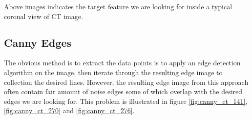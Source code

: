 Above images indicates the target feature we are looking for inside a typical coronal view of CT image.

\subsection{Canny Edges}

The obvious method is to extract the data points is to apply an edge detection algorithm on the image, then
iterate through the resulting edge image to collection the desired lines. However, the resulting edge image from
this approach often contain fair amount of noise edges some of which overlap with the desired edges we are looking
for. This problem is illustrated in figure \ref{fig:canny_ct_141}, \ref{fig:canny_ct_270} and \ref{fig:canny_ct_276}.
 
